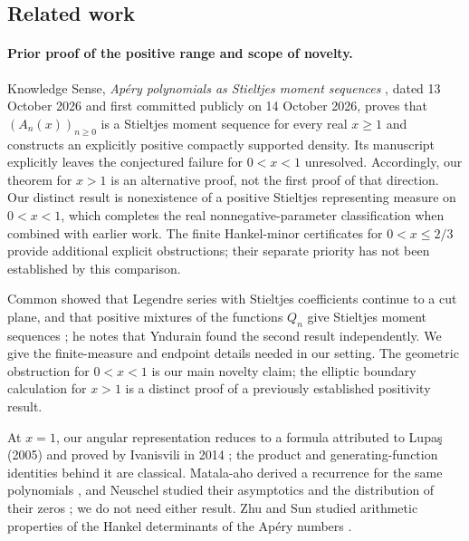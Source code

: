 \documentclass[11pt]{article}
\begin{document}
\subsection{Related work}
\paragraph{Prior proof of the positive range and scope of novelty.}
Knowledge Sense, \emph{Ap\'ery polynomials as Stieltjes moment sequences}
\cite{KnowledgeSense}, dated 13 October 2026 and first committed publicly
on 14 October 2026, proves that $(A_n(x))_{n\ge0}$ is a Stieltjes
moment sequence for every real $x\ge1$ and constructs an explicitly
positive compactly supported density. Its manuscript explicitly
leaves the conjectured failure for $0<x<1$ unresolved.
Accordingly, our theorem for $x>1$ is an alternative proof, not
the first proof of that direction. Our distinct result is
nonexistence of a positive Stieltjes representing measure on
$0<x<1$, which completes the real nonnegative-parameter
classification when combined with earlier work. The finite
Hankel-minor certificates for $0<x\le2/3$ provide additional
explicit obstructions; their separate priority has not been
established by this comparison.

Common showed that Legendre series with Stieltjes coefficients continue
to a cut plane, and that positive mixtures of the functions $Q_n$ give
Stieltjes moment sequences \cite[CERN preprint, Theorems 2--3 and 5]{Common};
he notes that Yndurain found the second result independently. We give
the finite-measure and endpoint details needed in our setting.
The geometric obstruction for $0<x<1$ is our main novelty claim;
the elliptic boundary calculation for $x>1$ is a distinct proof
of a previously established positivity result.

At $x=1$, our angular representation reduces to a formula attributed to
Lupa\c{s} (2005) and proved by Ivanisvili in 2014 \cite{Lupas}; the
product and generating-function identities behind it are classical.
Matala-aho derived a recurrence for the same polynomials
\cite[Theorem~2]{MatalaAho}, and Neuschel studied their asymptotics and
the distribution of their zeros \cite{Neuschel}; we do not need either
result. Zhu and Sun studied arithmetic properties of the Hankel
determinants of the Ap\'ery numbers \cite{ZhuSun}.
\end{document}
